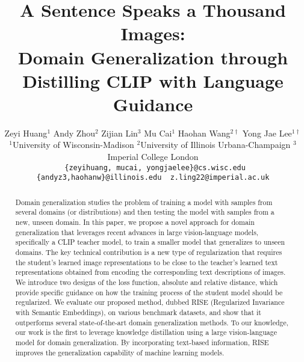 \documentclass[10pt,twocolumn,letterpaper]{article}
\newcommand{\name}{{\color{black} RISE}}
\begin{document}
\title{
A Sentence Speaks a Thousand Images:\\
Domain Generalization through Distilling CLIP with Language Guidance
}

\author{
Zeyi Huang$^1$ \hspace{0.6cm} Andy Zhou$^2$ \hspace{0.6cm} Zijian Lin$^3$ \hspace{0.6cm} Mu Cai$^1$ \hspace{0.6cm} Haohan Wang$^{2\dagger}$ \hspace{0.6cm} Yong Jae Lee$^{1\dagger}$ 
\\
{$^1$University of Wisconsin-Madison \hspace{0.3cm} $^2$University of Illinois Urbana-Champaign} \hspace{0.3cm} $^3$Imperial College London\\
\tt\small{ \{zeyihuang, mucai, yongjaelee\}}@cs.wisc.edu  \tt\small{ \{andyz3,haohanw\}}@illinois.edu  \tt\small{ z.ling22}@imperial.ac.uk\\
}

\maketitle
\ificcvfinal\thispagestyle{empty}\fi

\begin{abstract}


Domain generalization studies the problem of training a model with samples from several domains (or distributions)
and then testing the model with samples from a new, unseen domain.
In this paper, 
we propose a novel approach for domain generalization that leverages recent advances in large vision-language models, specifically a CLIP teacher model, to train a smaller model that generalizes to unseen domains. The key technical contribution is a new type of regularization that requires the student's learned image representations to be close to the teacher's learned text representations obtained from encoding the corresponding text descriptions of images. 
We introduce two designs of the loss function, absolute and relative distance, which provide specific guidance on how the training process of the student model should be regularized. 
We evaluate our proposed method,
dubbed \name{} (Regularized Invariance with Semantic Embeddings),
on various benchmark datasets, and show that it outperforms several state-of-the-art domain generalization methods. 
To our knowledge, our work is the first to leverage knowledge distillation using a large vision-language model for domain generalization. By incorporating text-based information, \name{} improves the generalization capability of machine learning models.




\end{abstract}
\end{document}
